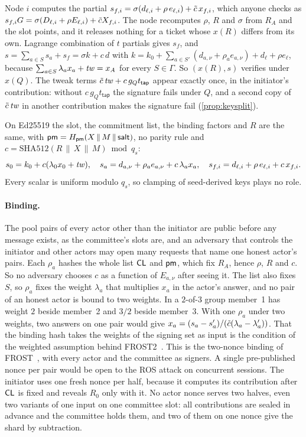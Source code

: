Node $i$ computes the partial $s_{f,i} = \sigma(d_{\ell,i} + \rho\,e_{\ell,i}) + \tilde{c}\,x_{f,i}$, which anyone checks as $s_{f,i} G = \sigma(D_{\ell,i} + \rho E_{\ell,i}) + \tilde{c} X_{f,i}$. The node recomputes $\rho$, $R$ and $\sigma$ from $R_A$ and the slot points, and it releases nothing for a ticket whose $x(R)$ differs from its own. Lagrange combination of $t$ partials gives $s_f$, and $s = \sum_{a \in S} s_a + s_f = \sigma k + c\,d$ with $k = k_0 + \sum_{a \in S'}(d_{a,\nu} + \rho_a e_{a,\nu}) + d_\ell + \rho e_\ell$, because $\sum_{a \in S} \lambda_a x_a + \mathit{tw} = x_A$ for every $S \in \Gamma$. So $(x(R), s)$ verifies under $x(Q)$. The tweak terms $\tilde{c}\,\mathit{tw} + c\,g_Q t_{\mathsf{tap}}$ appear exactly once, in the initiator's contribution: without $c\,g_Q t_{\mathsf{tap}}$ the signature fails under $Q$, and a second copy of $\tilde{c}\,\mathit{tw}$ in another contribution makes the signature fail (\cref{prop:keysplit}).

On Ed25519 the slot, the commitment list, the binding factors and $R$ are the same, with $\mathsf{pm} = H_{\mathsf{pm}}(X \,\|\, M \,\|\, \mathsf{salt})$, no parity rule and $c = \mathrm{SHA512}(R \,\|\, X \,\|\, M) \bmod q_s$:
\[
  s_0 = k_0 + c(\lambda_0 x_0 + \mathit{tw}), \quad s_a = d_{a,\nu} + \rho_a e_{a,\nu} + c\,\lambda_a x_a, \quad s_{f,i} = d_{\ell,i} + \rho\,e_{\ell,i} + c\,x_{f,i}.
\]
Every scalar is uniform modulo $q_s$, so clamping of seed-derived keys plays no role.

\paragraph{Binding.} The pool pairs of every actor other than the initiator are public before any message exists, as the committee's slots are, and an adversary that controls the initiator and other actors may open many requests that name one honest actor's pairs. Each $\rho_a$ hashes the whole list $\mathsf{CL}$ and $\mathsf{pm}$, which fix $R_A$, hence $\rho$, $R$ and $c$. So no adversary chooses $c$ as a function of $E_{a,\nu}$ after seeing it. The list also fixes $S$, so $\rho_a$ fixes the weight $\lambda_a$ that multiplies $x_a$ in the actor's answer, and no pair of an honest actor is bound to two weights. In a $2$-of-$3$ group member~1 has weight $2$ beside member~2 and $3/2$ beside member~3. With one $\rho_a$ under two weights, two answers on one pair would give $x_a = (s_a - s_a')/(\tilde{c}(\lambda_a - \lambda_a'))$. That the binding hash takes the weights of the signing set as input is the condition of the weighted assumption behind FROST2~\cite{BTA22}. This is the two-nonce binding of FROST~\cite{FROST,RFC9591}, with every actor and the committee as signers. A single pre-published nonce per pair would be open to the ROS attack on concurrent sessions. The initiator uses one fresh nonce per half, because it computes its contribution after $\mathsf{CL}$ is fixed and reveals $R_0$ only with it. No actor nonce serves two halves, even two variants of one input on one committee slot: all contributions are sealed in advance and the committee holds them, and two of them on one nonce give the shard by subtraction.

